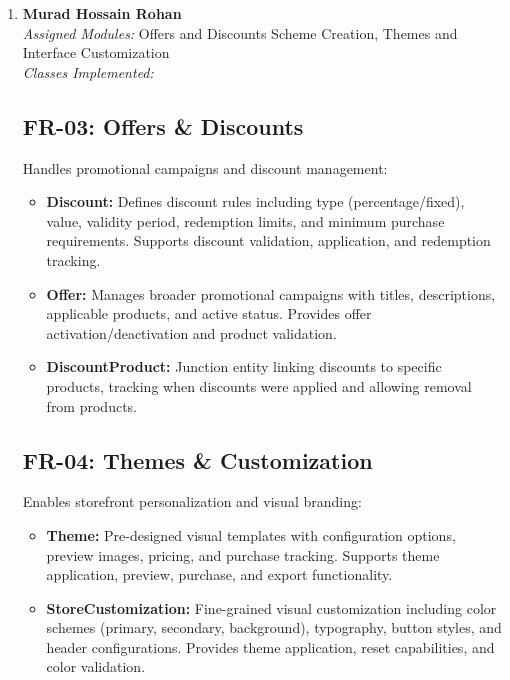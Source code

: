 \begin{enumerate}
\begin{itemize}
    \item \textbf{DatabaseInstance:} Manages physical or virtual database servers hosting multiple tenants. Includes server addressing, port configuration, health monitoring, and tenant distribution management.
\end{itemize}

\item \textbf{Murad Hossain Rohan} \\
\textit{Assigned Modules:} Offers and Discounts Scheme Creation, Themes and Interface Customization \\
\textit{Classes Implemented:}
\subsection*{FR-03: Offers \& Discounts}
Handles promotional campaigns and discount management:

\begin{itemize}
    \item \textbf{Discount:} Defines discount rules including type (percentage/fixed), value, validity period, redemption limits, and minimum purchase requirements. Supports discount validation, application, and redemption tracking.
    
    \item \textbf{Offer:} Manages broader promotional campaigns with titles, descriptions, applicable products, and active status. Provides offer activation/deactivation and product validation.
    
    \item \textbf{DiscountProduct:} Junction entity linking discounts to specific products, tracking when discounts were applied and allowing removal from products.
\end{itemize}

\subsection*{FR-04: Themes \& Customization}
Enables storefront personalization and visual branding:

\begin{itemize}
    \item \textbf{Theme:} Pre-designed visual templates with configuration options, preview images, pricing, and purchase tracking. Supports theme application, preview, purchase, and export functionality.
    
    \item \textbf{StoreCustomization:} Fine-grained visual customization including color schemes (primary, secondary, background), typography, button styles, and header configurations. Provides theme application, reset capabilities, and color validation.
\end{itemize}


\end{enumerate}
